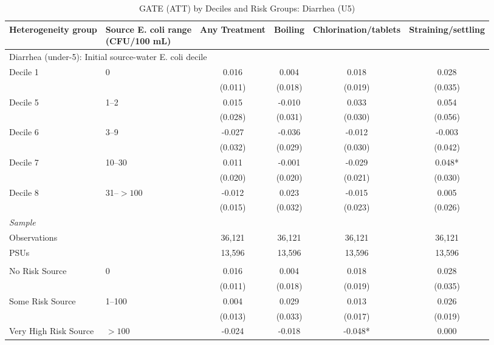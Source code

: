 \begin{landscape}
\begin{table}[p]
\centering
\caption{GATE (ATT) by Deciles and Risk Groups: Diarrhea (U5)}
\label{tab:table_gate_main-diarrhea}
\scriptsize\setlength{\tabcolsep}{4pt}
\begin{adjustbox}{max width=\linewidth, center}
\begin{tabular}{llcccc}
\toprule
Heterogeneity group & \shortstack{Source E. coli range\\(CFU/100 mL)} & Any Treatment & Boiling & Chlorination/tablets & Straining/settling \\
\midrule
\multicolumn{6}{l}{Diarrhea (under-5): Initial source-water E. coli decile} \\
Decile 1 & 0 & 0.016 & 0.004 & 0.018 & 0.028 \\
 &  & (0.011) & (0.018) & (0.019) & (0.035) \\
Decile 5 & 1--2 & 0.015 & -0.010 & 0.033 & 0.054 \\
 &  & (0.028) & (0.031) & (0.030) & (0.056) \\
Decile 6 & 3--9 & -0.027 & -0.036 & -0.012 & -0.003 \\
 &  & (0.032) & (0.029) & (0.030) & (0.042) \\
Decile 7 & 10--30 & 0.011 & -0.001 & -0.029 & 0.048* \\
 &  & (0.020) & (0.020) & (0.021) & (0.030) \\
Decile 8 & 31--$>100$ & -0.012 & 0.023 & -0.015 & 0.005 \\
 &  & (0.015) & (0.032) & (0.023) & (0.026) \\
\multicolumn{6}{l}{\textit{Sample}} \\
\quad Observations &  & 36,121 & 36,121 & 36,121 & 36,121 \\
\quad PSUs &  & 13,596 & 13,596 & 13,596 & 13,596 \\
\addlinespace[4pt]
\multicolumn{6}{l}{Diarrhea (under-5): Initial source-water E. coli risk} \\
No Risk Source & 0 & 0.016 & 0.004 & 0.018 & 0.028 \\
 &  & (0.011) & (0.018) & (0.019) & (0.035) \\
Some Risk Source & 1--100 & 0.004 & 0.029 & 0.013 & 0.026 \\
 &  & (0.013) & (0.033) & (0.017) & (0.019) \\
Very High Risk Source & $>100$ & -0.024 & -0.018 & -0.048* & 0.000 \\

\end{tabular}
\end{adjustbox}
\end{table}
\end{landscape}

